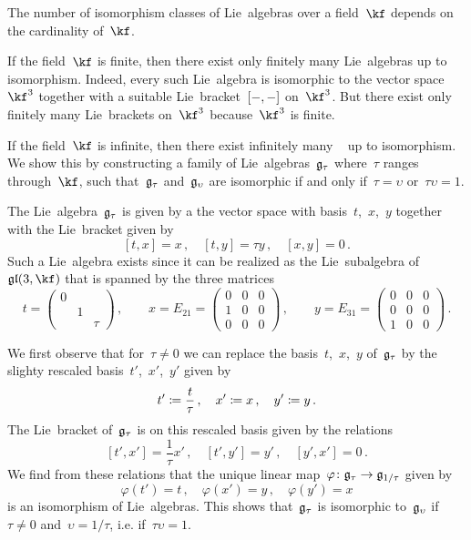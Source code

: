 \begin{example}
	\label{infinitely many three-dimensional lie algebras}
	The number of isomorphism classes of {\threedimensional} Lie~algebras over a field~$\kf$ depends on the cardinality of~$\kf$.

	If the field~$\kf$ is finite, then there exist only finitely many {\threedimensional} Lie~algebras up to isomorphism.
	Indeed, every such Lie~algebra is isomorphic to the vector space~$\kf^3$ together with a suitable Lie~bracket~$[-, -]$ on~$\kf^3$.
	But there exist only finitely many Lie~brackets on~$\kf^3$ because~$\kf^3$ is finite.

	If the field~$\kf$ is infinite, then there exist infinitely many {\threedimensional}~\liealgebras{$\kf$} up to isomorphism.
	We show this by constructing a family of Lie~algebras~$\mathfrak{g}_\tau$ where~$\tau$ ranges through~$\kf$, such that~$\mathfrak{g}_\tau$ and~$\mathfrak{g}_\upsilon$ are isomorphic if and only if~$\tau = \upsilon$ or~$\tau \upsilon = 1$.

	The Lie~algebra~$\mathfrak{g}_\tau$ is given by a the vector space with basis~$t$,~$x$,~$y$ together with the Lie~bracket given by
	\[
		[t, x] = x \,,
		\quad
		[t, y] = \tau y \,,
		\quad
		[x, y] = 0 \,.
	\]
	Such a Lie~algebra exists since it can be realized as the Lie~subalgebra of~$\gllie(3, \kf)$ that is spanned by the three matrices
	\[
		t
		=
		\begin{pmatrix}
			0 &   &       \\
				& 1 &       \\
				&   & \tau
		\end{pmatrix} \,,
		\qquad
		x
		=
		E_{21} 
		=
		\begin{pmatrix}
			0 & 0 & 0 \\
			1 & 0 & 0 \\
			0 & 0 & 0
		\end{pmatrix} \,,
		\qquad
		y
		=
		E_{31}
		=
		\begin{pmatrix}
			0 & 0 & 0 \\
			0 & 0 & 0 \\
			1 & 0 & 0
		\end{pmatrix} \,.
	\]

	We first observe that for~$\tau \neq 0$ we can replace the basis~$t$,~$x$,~$y$ of~$\mathfrak{g}_\tau$ by the slighty rescaled basis~$t'$,~$x'$,~$y'$ given by
	\[
		t' \coloneqq \frac{t}{\tau} \,,
		\quad
		x' \coloneqq x \,,
		\quad
		y' \coloneqq y \,.
	\]
	The Lie~bracket of~$\mathfrak{g}_\tau$ is on this rescaled basis given by the relations
	\[
		[t', x'] = \frac{1}{\tau} x' \,,
		\quad
		[t', y'] = y' \,,
		\quad
		[y', x'] = 0 \,.
	\]
	We find from these relations that the unique linear map~$\varphi \colon \glie_{\tau} \to \glie_{1/\tau}$ given by
	\[
		\varphi(t') = t \,,
		\quad
		\varphi(x') = y \,,
		\quad
		\varphi(y') = x
	\]
	is an isomorphism of Lie~algebras.
	This shows that~$\mathfrak{g}_{\tau}$ is isomorphic to~$\mathfrak{g}_{\upsilon}$ if~$\tau \neq 0$ and~$\upsilon = 1/\tau$, i.e. if~$\tau \upsilon = 1$.
	

\end{example}
